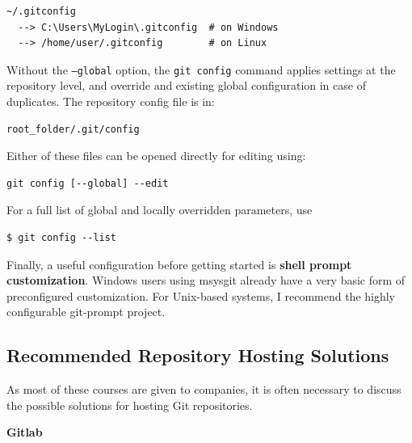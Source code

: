 \documentclass[a4paper]{../../common/tufte-latex/tufte-handout}
\begin{document}
\begin{lstlisting}[style=BashInputStyle]
  ~/.gitconfig
  --> C:\Users\MyLogin\.gitconfig  # on Windows
  --> /home/user/.gitconfig        # on Linux
\end{lstlisting}

Without the \texttt{--global} option, the \texttt{git config} command applies settings at the repository level, and override and existing global configuration in case of duplicates. The repository config file is in:

\begin{lstlisting}[style=BashInputStyle]
  root_folder/.git/config
\end{lstlisting}

\noindent Either of these files can be opened directly for editing using: 

\begin{lstlisting}[style=BashInputStyle]
  git config [--global] --edit
\end{lstlisting}

\noindent For a full list of global and locally overridden parameters, use

\begin{lstlisting}[style=BashInputStyle]
  $ git config --list
\end{lstlisting}

Finally, a useful configuration before getting started is \textbf{shell prompt customization}.
Windows users using msysgit already have a very basic form of preconfigured customization. 
For Unix-based systems, I recommend the highly configurable git-prompt project. 


\subsection{Recommended Repository Hosting Solutions}

As most of these courses are given to companies, it is often necessary to discuss the possible solutions for hosting Git repositories.

\textbf{Gitlab}
\end{document}
